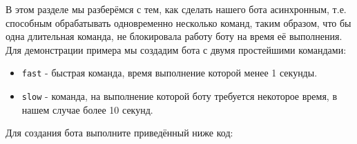 \documentclass[
]{book}
\providecommand{\tightlist}{%
  \setlength{\itemsep}{0pt}\setlength{\parskip}{0pt}}
\begin{document}
В этом разделе мы разберёмся с тем, как сделать нашего бота асинхронным, т.е. способным обрабатывать одновременно несколько команд, таким образом, что бы одна длительная команда, не блокировала работу боту на время её выполнения. Для демонстрации примера мы создадим бота с двумя простейшими командами:

\begin{itemize}
\tightlist
\item
  \texttt{fast} - быстрая команда, время выполнение которой менее 1 секунды.
\item
  \texttt{slow} - команда, на выполнение которой боту требуется некоторое время, в нашем случае более 10 секунд.
\end{itemize}

Для создания бота выполните приведённый ниже код:
\end{document}
